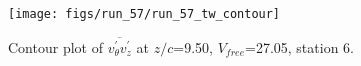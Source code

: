 \begin{figure}[H]
\centering
\texttt{[image: figs/run\_57/run\_57\_tw\_contour]}
\caption{Contour plot of $\overline{v_{\theta}^{\prime} v_{z}^{\prime}}$ at $z/c$=9.50, $V_{free}$=27.05, station 6.}
\label{fig:run_57_tw_contour}
\end{figure}


